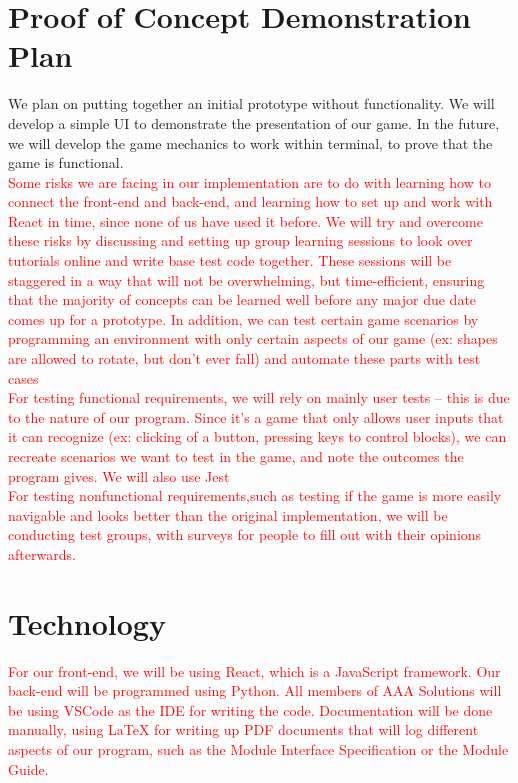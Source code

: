 \documentclass{article}
\begin{document}
\section{Proof of Concept Demonstration Plan}
We plan on putting together an initial prototype without functionality. We will develop a simple UI to demonstrate the presentation of our game. In the future, we will develop the game mechanics to work within terminal, to prove that the game is functional.\\
\textcolor{red}{Some risks we are facing in our implementation are to do with learning how to connect the front-end and back-end, and learning how to set up and work with React in time, since none of us have used it before. We will try and overcome these risks by discussing and setting up group learning sessions to look over tutorials online and write base test code together. These sessions will be staggered in a way that will not be overwhelming, but time-efficient, ensuring that the majority of concepts can be learned well before any major due date comes up for a prototype. In addition, we can test certain game scenarios by programming an environment with only certain aspects of our game (ex: shapes are allowed to rotate, but don't ever fall)
and automate these parts with test cases
\\For testing functional requirements, we will rely on mainly user tests -- this is due to the nature of our program. Since it's a game that only allows user inputs that it can recognize (ex: clicking of a button, pressing keys to control blocks), we can recreate scenarios we want to test in the game, and note the outcomes the program gives. We will also use Jest 
\\For testing nonfunctional requirements,such as testing if the game is more easily navigable and looks better than the original implementation, we will be conducting test groups, with surveys for people to fill out with their opinions afterwards.
}

\section{Technology}
\textcolor{red}{For our front-end, we will be using React, which is a JavaScript framework. Our back-end will be programmed using Python. All members of AAA Solutions will be using VSCode as the IDE for writing the code. Documentation will be done manually, using LaTeX for writing up PDF documents that will log different aspects of our program, such as the Module Interface Specification or the Module Guide.}
\end{document}
